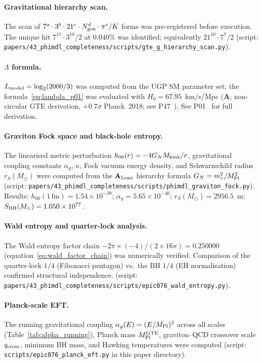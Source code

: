 \documentclass[11pt]{article}
\theoremstyle{remark}
\newcommand{\CatA}{\textbf{A}}
\newcommand{\CatAL}{\ensuremath{\textbf{A}_{\rm Lean}}}
\begin{document}
\begin{appendices}
\paragraph{Gravitational hierarchy scan.}
The scan of $7^a\cdot3^b\cdot21^c\cdot N_{\rm gen}^d\cdot\pi^e / K$ forms
was pre-registered before execution.  The unique hit $7^{17}\cdot3^{10}/2$
at $0.040\%$ was identified; equivalently $21^{10}\cdot7^7/2$
(script: \texttt{papers/43\_phimdl\_completeness/scripts/gte\_g\_hierarchy\_scan.py}).

\paragraph{$\Lambda$ formula.}
$L_{\rm model} = \log_2(2000/3)$ was computed from the UGP SM parameter
set; the formula~\eqref{eq:lambda_p01} was evaluated with $H_0 = 67.95$~km/s/Mpc
($\CatA$; non-circular GTE derivation, $+0.7\sigma$ Planck~2018; see
P47~\cite{SpivackGTECosmology}).  See P01~\cite{Spivack2026_SM_UGP} for full derivation.

\paragraph{Graviton Fock space and black-hole entropy.}
The linearised metric perturbation $h_{00}(r) = -4G_N M_{\rm kink}/r$,
gravitational coupling constants $\alpha_g$, $\kappa$, Fock vacuum energy
density, and Schwarzschild radius $r_S(M_\odot)$ were computed from the
$\CatAL$ hierarchy formula $G_N = m_\tau^2/M_{\rm Pl}^2$
(script: \texttt{papers/43\_phimdl\_completeness/scripts/phimdl\_graviton\_fock.py}).
Results: $h_{00}(1\,\text{fm}) = 1.54\times10^{-39}$;
$\alpha_g = 5.65\times10^{-40}$; $r_S(M_\odot) = 2956.5$~m;
$S_{\rm BH}(M_\odot) = 1.050\times10^{77}$.

\paragraph{Wald entropy and quarter-lock analysis.}
The Wald entropy factor chain $-2\pi\times(-4)/(2\times16\pi) = 0.250000$
(equation~\eqref{eq:wald_factor_chain}) was numerically verified.
Comparison of the quarter-lock $1/4$ (Fibonacci pentagon) vs.\ the BH
$1/4$ (EH normalisation) confirmed structural independence.
(script: \texttt{papers/43\_phimdl\_completeness/scripts/epic076\_wald\_entropy.py}).

\paragraph{Planck-scale EFT.}
The running gravitational coupling $\alpha_g(E)=(E/M_{\rm Pl})^2$ across
all scales (Table~\ref{tab:alpha_running}), Planck mass $M_{\rm Pl}^{\rm GTE}$,
graviton--QCD crossover scale $q_{\rm cross}$, minimum BH mass, and Hawking
temperatures were computed (script:
\texttt{scripts/epic076\_planck\_eft.py} in this paper directory).


\end{appendices}
\end{document}
